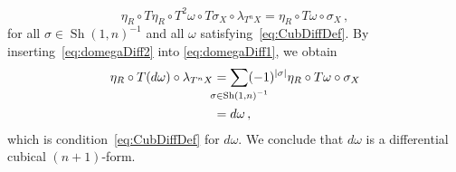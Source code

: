 \documentclass[12pt,reqno, a4paper]{amsart}
\numberwithin{equation}{section}
\theoremstyle{plain}
\theoremstyle{definition}
\theoremstyle{remark}
\DeclareMathOperator{\Shuff}{Sh}
\newcommand{\Val}{\eta}
\begin{document}
\begin{equation}
\label{eq:domegaDiff2}
  \Val_R \circ T\Val_R \circ T^2 \omega \circ T\sigma_X
  \circ \lambda_{T^n X}
  =
  \Val_R \circ T\omega \circ \sigma_X
  \,,
\end{equation}
for all $\sigma \in \Shuff(1,n)^{-1}$ and all $\omega$ satisfying~\eqref{eq:CubDiffDef}. By inserting~\eqref{eq:domegaDiff2} into \eqref{eq:domegaDiff1}, we obtain
\begin{equation*}
\begin{split}
  \Val_R \circ T(d\omega) \circ \lambda_{T^n X}
  &=
  \sum_{\mathclap{\sigma \in \Shuff(1,n)^{-1} }}
  (-1)^{|\sigma|} 
  \Val_R \circ T\omega \circ \sigma_X
  \\
  &= d\omega
  \,,
\end{split}
\end{equation*}
which is condition~\eqref{eq:CubDiffDef} for $d\omega$. We conclude that $d\omega$ is a differential cubical $(n+1)$-form.
\end{document}
